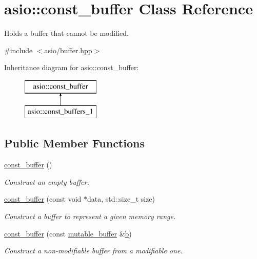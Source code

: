 \hypertarget{classasio_1_1const__buffer}{}\section{asio\+:\+:const\+\_\+buffer Class Reference}
\label{classasio_1_1const__buffer}


Holds a buffer that cannot be modified.  




{\ttfamily \#include $<$asio/buffer.\+hpp$>$}

Inheritance diagram for asio\+:\+:const\+\_\+buffer\+:\begin{figure}[H]
\begin{center}
\leavevmode
\includegraphics[height=2.000000cm]{classasio_1_1const__buffer}
\end{center}
\end{figure}
\subsection*{Public Member Functions}
\begin{DoxyCompactItemize}
\item 
\hyperlink{classasio_1_1const__buffer_a6b8641ed8d12228678c4a18e40656996}{const\+\_\+buffer} ()
\begin{DoxyCompactList}\small\item\em Construct an empty buffer. \end{DoxyCompactList}\item 
\hyperlink{classasio_1_1const__buffer_a155769ebff7a9f7774c8e46b8b744fb5}{const\+\_\+buffer} (const void $\ast$data, std\+::size\+\_\+t size)
\begin{DoxyCompactList}\small\item\em Construct a buffer to represent a given memory range. \end{DoxyCompactList}\item 
\hyperlink{classasio_1_1const__buffer_afa7ee6de40034bad0dd182cfd81437cc}{const\+\_\+buffer} (const \hyperlink{classasio_1_1mutable__buffer}{mutable\+\_\+buffer} \&\hyperlink{group__async__read_ga945a5c18fa77a9e2eba420f8f44b2a4f}{b})
\begin{DoxyCompactList}\small\item\em Construct a non-\/modifiable buffer from a modifiable one. \end{DoxyCompactList}\end{DoxyCompactItemize}
